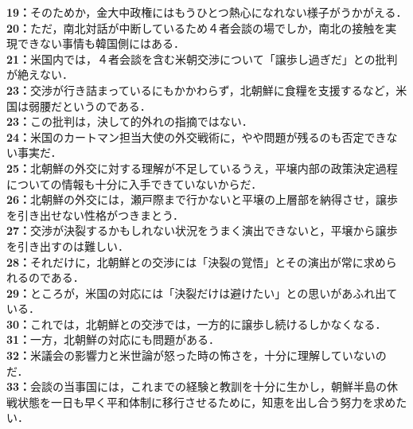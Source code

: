 \textbf{19：}そのためか，金大中政権にはもうひとつ熱心になれない様子がうかがえる．\\
\textbf{20：}ただ，南北対話が中断しているため４者会談の場でしか，南北の接触を実現できない事情も韓国側にはある．\\
\textbf{21：}米国内では，４者会談を含む米朝交渉について「譲歩し過ぎだ」との批判が絶えない．\\
\textbf{23：}交渉が行き詰まっているにもかかわらず，北朝鮮に食糧を支援するなど，米国は弱腰だというのである．\\
\textbf{23：}この批判は，決して的外れの指摘ではない．\\
\textbf{24：}米国のカートマン担当大使の外交戦術に，やや問題が残るのも否定できない事実だ．\\
\textbf{25：}北朝鮮の外交に対する理解が不足しているうえ，平壌内部の政策決定過程についての情報も十分に入手できていないからだ．\\
\textbf{26：}北朝鮮の外交には，瀬戸際まで行かないと平壌の上層部を納得させ，譲歩を引き出せない性格がつきまとう．\\
\textbf{27：}交渉が決裂するかもしれない状況をうまく演出できないと，平壌から譲歩を引き出すのは難しい．\\
\textbf{28：}それだけに，北朝鮮との交渉には「決裂の覚悟」とその演出が常に求められるのである．\\
\textbf{29：}ところが，米国の対応には「決裂だけは避けたい」との思いがあふれ出ている．\\
\textbf{30：}これでは，北朝鮮との交渉では，一方的に譲歩し続けるしかなくなる．\\
\textbf{31：}一方，北朝鮮の対応にも問題がある．\\
\textbf{32：}米議会の影響力と米世論が怒った時の怖さを，十分に理解していないのだ．\\
\textbf{33：}会談の当事国には，これまでの経験と教訓を十分に生かし，朝鮮半島の休戦状態を一日も早く平和体制に移行させるために，知恵を出し合う努力を求めたい．\\
